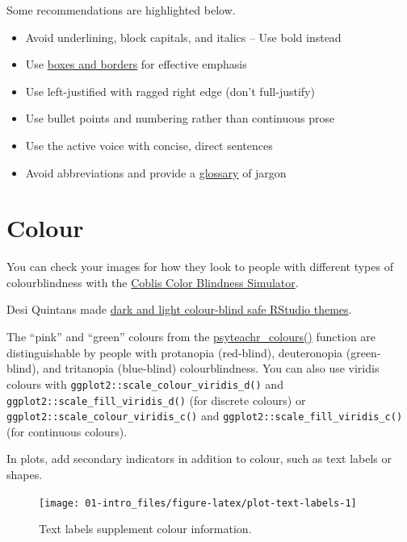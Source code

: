 \documentclass[
  oneside]{book}
\providecommand{\tightlist}{%
  \setlength{\itemsep}{0pt}\setlength{\parskip}{0pt}}
\begin{document}
Some recommendations are highlighted below.

\begin{itemize}
\tightlist
\item
  Avoid underlining, block capitals, and italics -- Use bold instead
\item
  Use \href{conventions.html\#alert-boxes}{boxes and borders} for effective emphasis
\item
  Use left-justified with ragged right edge (don't full-justify)
\item
  Use bullet points and numbering rather than continuous prose
\item
  Use the active voice with concise, direct sentences
\item
  Avoid abbreviations and provide a \href{glossary.html}{glossary} of jargon
\end{itemize}

\hypertarget{colour}{%
\section{Colour}\label{colour}}

You can check your images for how they look to people with different types of colourblindness with the \href{https://www.color-blindness.com/coblis-color-blindness-simulator/}{Coblis Color Blindness Simulator}.

Desi Quintans made \href{https://github.com/DesiQuintans/Pebble-safe}{dark and light colour-blind safe RStudio themes}.

The ``pink'' and ``green'' colours from the \href{}{psyteachr\_colours()} function are distinguishable by people with protanopia (red-blind), deuteronopia (green-blind), and tritanopia (blue-blind) colourblindness. You can also use viridis colours with \texttt{ggplot2::scale\_colour\_viridis\_d()} and \texttt{ggplot2::scale\_fill\_viridis\_d()} (for discrete colours) or \texttt{ggplot2::scale\_colour\_viridis\_c()} and \texttt{ggplot2::scale\_fill\_viridis\_c()} (for continuous colours).

In plots, add secondary indicators in addition to colour, such as text labels or shapes.

\begin{figure}

{\centering \texttt{[image: 01-intro\_files/figure-latex/plot-text-labels-1]} 

}

\caption{Text labels supplement colour information.}\label{fig:plot-text-labels}
\end{figure}
\end{document}
